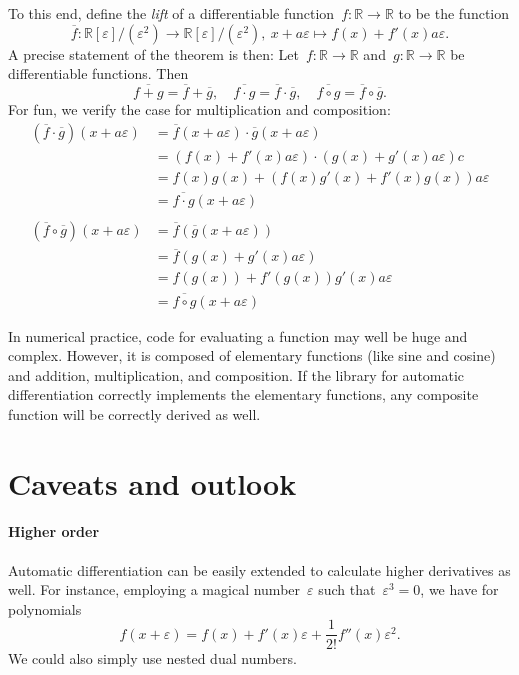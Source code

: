 \documentclass[a4paper,ngerman,12pt]{scrartcl}
\theoremstyle{definition}
\theoremstyle{plain}
\theoremstyle{remark}
\newcommand{\RR}{\mathbb{R}}
\newcommand{\DD}{\mathbb{R}[\varepsilon]/(\varepsilon^2)}
\begin{document}
To this end, define the \emph{lift} of a differentiable function~$f : \RR \to
\RR$ to be the function
\[ \overline{f} : \DD \to \DD,\ x+a\varepsilon \mapsto f(x) + f'(x)a\varepsilon. \]
A precise statement of the theorem is then: Let~$f : \RR \to \RR$ and~$g : \RR
\to \RR$ be differentiable functions. Then
\[ \overline{f + g} = \overline{f} + \overline{g}, \quad
  \overline{f \cdot g} = \overline{f} \cdot \overline{g}, \quad
  \overline{f \circ g} = \overline{f} \circ \overline{g}. \]
For fun, we verify the case for multiplication and composition:
\begin{align*}
  (\overline{f} \cdot \overline{g})(x+a\varepsilon)
  &= \overline{f}(x+a\varepsilon) \cdot \overline{g}(x+a\varepsilon) \\
  &= (f(x) + f'(x)a\varepsilon) \cdot (g(x) + g'(x)a\varepsilon)c \\
  &= f(x) g(x) + (f(x)g'(x) + f'(x)g(x))a\varepsilon \\
  &= \overline{f \cdot g}(x+a\varepsilon) \\
  \\
  (\overline{f} \circ \overline{g})(x+a\varepsilon)
  &= \overline{f}(\overline{g}(x+a\varepsilon)) \\
  &= \overline{f}(g(x)+g'(x)a\varepsilon) \\
  &= f(g(x)) + f'(g(x))g'(x)a\varepsilon \\
  &= \overline{f \circ g}(x+a\varepsilon)
\end{align*}

In numerical practice, code for evaluating a function may well be huge and
complex. However, it is composed of elementary functions (like sine and cosine)
and addition, multiplication, and composition. If the library for automatic
differentiation correctly implements the elementary functions, any composite
function will be correctly derived as well.


\section{Caveats and outlook}

\paragraph{Higher order} Automatic differentiation can be easily extended to
calculate higher derivatives as well. For instance, employing a magical
number~$\varepsilon$ such that~$\varepsilon^3 = 0$, we have for polynomials
\[ f(x+\varepsilon) = f(x) + f'(x)\varepsilon +
\frac{1}{2!}f''(x)\varepsilon^2. \]
We could also simply use nested dual numbers.
\end{document}
